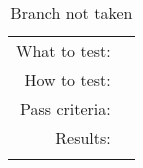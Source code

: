 \begin{table}[H]
  \begin{tabular}{r | p{8cm}}
    \noalign{\smallskip}\hline\noalign{\smallskip}
    
    What to test:  & \\

    \noalign{\smallskip}\hline\noalign{\smallskip}

    How to test:   &  \\

    \noalign{\smallskip}\hline\noalign{\smallskip}

    Pass criteria: & \\

    \noalign{\smallskip}\hline\noalign{\smallskip}
    
    Results: &   \\
   \noalign{\smallskip}\hline\noalign{\smallskip}
  
  
  
  \end{tabular}
  \caption{Branch not taken}
  \label{testing:fitness:pipeline_test}
\end{table}